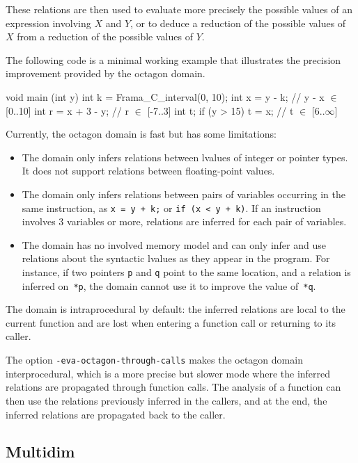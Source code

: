\documentclass{frama-c-book}
\begin{document}
These relations are then used to evaluate more precisely the possible values
of an expression involving $X$ and $Y$, or to deduce a reduction of
the possible values of $X$ from a reduction of the possible values of $Y$.

The following code is a minimal working example that illustrates
the precision improvement provided by the octagon domain.
\begin{listing-nonumber}
void main (int y) {
  int k = Frama_C_interval(0, 10);
  int x = y - k;               // y - x $\in$ [0..10]
  int r = x + 3 - y;           // r $\in$ [-7..3]
  int t;
  if (y > 15)
    t = x;                     // t $\in$ [6..$\infty$]
}
\end{listing-nonumber}


Currently, the octagon domain is fast but has some limitations:
\begin{itemize}
\item
  The domain only infers relations between lvalues of integer or
  pointer types.
  It does not support relations between floating-point values.
\item
  The domain only infers relations between pairs of variables occurring in the
  same instruction, as \lstinline|x = y + k;| or \lstinline|if (x < y + k)|.
  If an instruction involves 3 variables or more, relations are inferred for
  each pair of variables.
\item
  The domain has no involved memory model and can only infer and use relations
  about the syntactic lvalues as they appear in the program.
  For instance, if two pointers \lstinline|p| and \lstinline|q| point to the
  same location, and a relation is inferred on \lstinline|*p|, the domain cannot
  use it to improve the value of \lstinline|*q|.
\end{itemize}

The domain is intraprocedural by default: the inferred relations are local to
the current function and are lost when entering a function call or returning
to its caller.

The option \verb+-eva-octagon-through-calls+ makes the octagon domain
interprocedural, which is a more precise but slower mode where
the inferred relations are propagated through function calls.
The analysis of a function can then use the relations previously inferred in the
callers, and at the end, the inferred relations are propagated back to the
caller.


\subsection{Multidim}
\label{sec:multidim}
\end{document}
